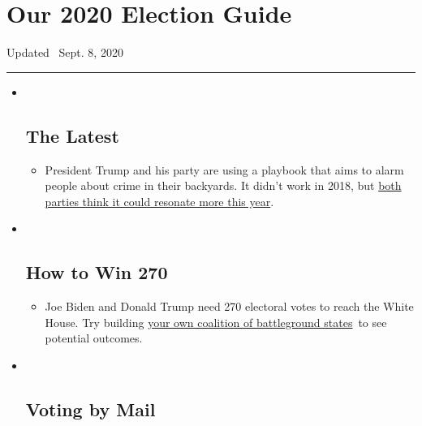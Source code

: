 \hypertarget{our-2020-election-guide}{%
\section{Our 2020 Election Guide}\label{our-2020-election-guide}}

Updated ~Sept. 8, 2020

\begin{center}\rule{0.5\linewidth}{\linethickness}\end{center}

\begin{itemize}
\item ~
  \hypertarget{the-latest}{%
  \subsection{The Latest}\label{the-latest}}

  \begin{itemize}
  \item
    President Trump and his party are using a playbook that aims to
    alarm people about crime in their backyards. It didn't work in 2018,
    but
    \href{https://www.nytimes3xbfgragh.onion/2020/09/08/us/politics/trump-republicans-fear-strategy.html?action=click\&pgtype=Article\&state=default\&region=BELOW_MAIN_CONTENT\&context=storylines_guide}{both
    parties think it could resonate more this year}.
  \end{itemize}
\item ~
  \hypertarget{how-to-win-270}{%
  \subsection{How to Win 270}\label{how-to-win-270}}

  \begin{itemize}
  \item
    Joe Biden and Donald Trump need 270 electoral votes to reach the
    White House. Try building
    \href{https://www.nytimes3xbfgragh.onion/interactive/2020/us/elections/election-states-biden-trump.html?action=click\&pgtype=Article\&state=default\&region=BELOW_MAIN_CONTENT\&context=storylines_guide}{your
    own coalition of battleground states}~to see potential outcomes.
  \end{itemize}
\item ~
  \hypertarget{voting-by-mail}{%
  \subsection{Voting by Mail}\label{voting-by-mail}}


\end{itemize}
